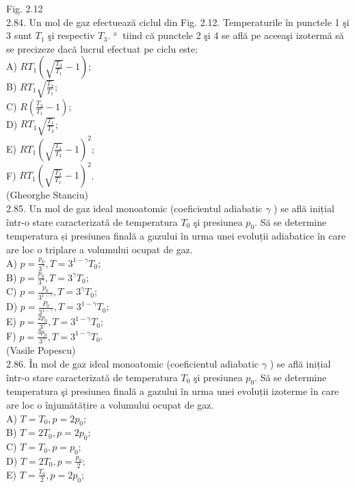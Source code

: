 Fig. 2.12\\
2.84. Un mol de gaz efectuează ciclul din Fig. 2.12. Temperaturile în punctele 1 şi 3 sunt $T_{1}$ şi respectiv $T_{3}$. ${ }^{\text {a }}$ tiind că punctele 2 şi 4 se află pe aceeaşi izotermă să se precizeze dacă lucrul efectuat pe ciclu este:\\
A) $R T_{1}\left(\sqrt{\frac{T_{3}}{T_{1}}}-1\right)$;\\
B) $R T_{1} \sqrt{\frac{T_{3}}{T_{1}}}$;\\
C) $R\left(\frac{T_{3}}{T_{1}}-1\right)$;\\
D) $R T_{1} \sqrt{\frac{T_{1}}{T_{3}}}$;\\
E) $R T_{1}\left(\sqrt{\frac{T_{1}}{T_{3}}}-1\right)^{2}$;\\
F) $R T_{1}\left(\sqrt{\frac{T_{3}}{T_{1}}}-1\right)^{2}$.\\
(Gheorghe Stanciu)\\
2.85. Un mol de gaz ideal monoatomic (coeficientul adiabatic $\gamma$ ) se află inițial într-o stare caracterizată de temperatura $T_{0}$ şi presiunea $p_{0}$. Să se determine temperatura și presiunea finală a gazului în urma unei evoluții adiabatice în care are loc o triplare a volumului ocupat de gaz.\\
A) $p=\frac{p_{0}}{3^{\gamma}}, T=3^{1-\gamma} T_{0}$;\\
B) $p=\frac{p_{0}}{3^{\gamma}}, T=3^{\gamma} T_{0}$;\\
C) $p=\frac{p_{0}}{3^{1-\gamma}}, T=3^{\gamma} T_{0}$;\\
D) $p=\frac{P_{0}}{3^{1-\gamma}}, T=3^{1-\gamma} T_{0}$;\\
E) $p=\frac{2 p_{0}}{3^{\gamma}}, T=3^{1-\gamma} T_{0}$;\\
F) $p=\frac{3 p_{0}}{3^{\gamma}}, T=3^{1-\gamma} T_{0}$.\\
(Vasile Popescu)\\
2.86. În mol de gaz ideal monoatomic (coeficientul adiabatic $\gamma$ ) se află inițial într-o stare caracterizată de temperatura $T_{0}$ şi presiunea $p_{0}$. Să se determine temperatura şi presiunea finală a gazului în urma unei evoluții izoterme în care are loc o înjumătățire a volumului ocupat de gaz.\\
A) $T=T_{0}, p=2 p_{0}$;\\
B) $T=2 T_{0}, p=2 p_{0}$;\\
C) $T=T_{0}, p=p_{0}$;\\
D) $T=2 T_{0}, p=\frac{p_{0}}{2}$;\\
E) $T=\frac{T_{0}}{2}, p=2 p_{0}$;\\
